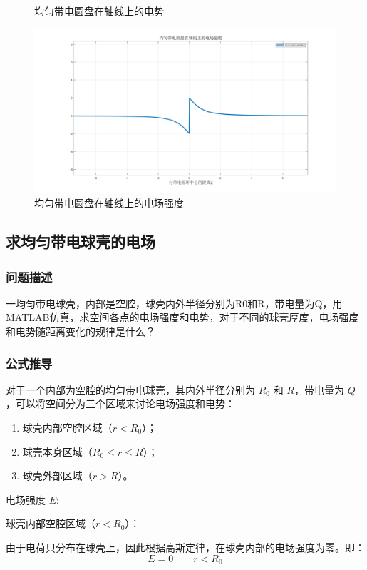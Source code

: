 \documentclass[UTF8]{article}
\numberwithin{figure}{subsection}
\numberwithin{table}{subsection}
\begin{document}
\begin{multicols}{2}
\begin{figure}[H]
		\caption{均匀带电圆盘在轴线上的电势}
	\end{figure}
	\begin{figure}[H]
		\centering
		\includegraphics[scale=0.15]{圆盘场强.png}
		\caption{均匀带电圆盘在轴线上的电场强度}
	\end{figure}
	\subsection{求均匀带电球壳的电场}
	\subsubsection{问题描述}
	\par 一均匀带电球壳，内部是空腔，球壳内外半径分别为R0和R，带电量为Q，用MATLAB仿真，求空间各点的电场强度和电势，对于不同的球壳厚度，电场强度和电势随距离变化的规律是什么？
	\subsubsection{公式推导}
	\par 对于一个内部为空腔的均匀带电球壳，其内外半径分别为 $R_0$ 和 $R$，带电量为 $Q$，可以将空间分为三个区域来讨论电场强度和电势：
	
	\begin{enumerate}
		\item 球壳内部空腔区域（$r < R_0$）；
		\item 球壳本身区域（$R_0 \leq r \leq R$）；
		\item 球壳外部区域（$r > R$）。
	\end{enumerate}
	
	电场强度 $E$:
	
	\par 球壳内部空腔区域（$r < R_0$）：
	\par 由于电荷只分布在球壳上，因此根据高斯定律，在球壳内部的电场强度为零。即：
	\[ E = 0 \quad  \quad r < R_0 \]
	

\end{multicols}
\end{document}
